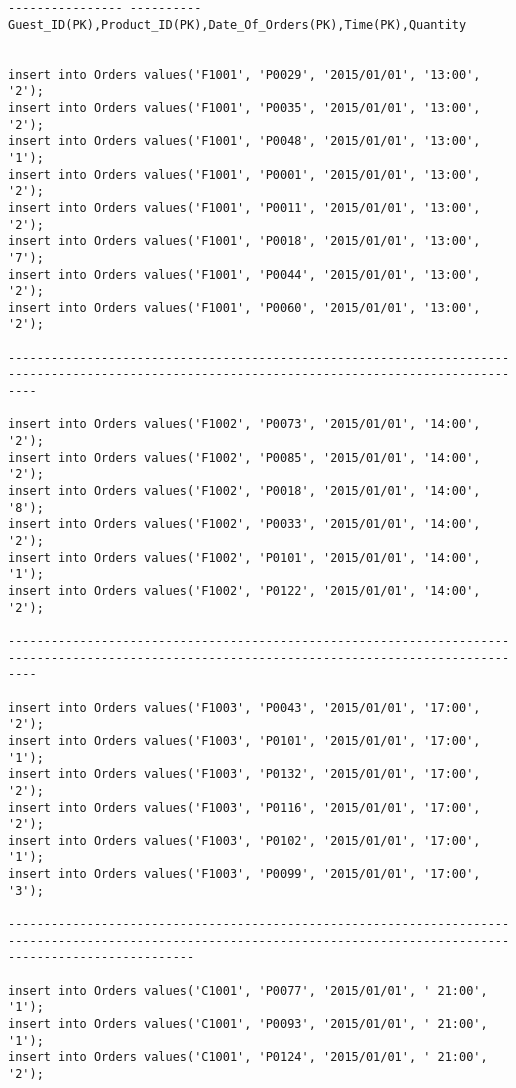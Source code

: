 \documentclass[a4,12pt]{report}
\begin{document}
\begin{lstlisting}
---------------- ----------Guest_ID(PK),Product_ID(PK),Date_Of_Orders(PK),Time(PK),Quantity


insert into Orders values('F1001', 'P0029', '2015/01/01', '13:00', '2');
insert into Orders values('F1001', 'P0035', '2015/01/01', '13:00', '2');
insert into Orders values('F1001', 'P0048', '2015/01/01', '13:00', '1');
insert into Orders values('F1001', 'P0001', '2015/01/01', '13:00', '2');
insert into Orders values('F1001', 'P0011', '2015/01/01', '13:00', '2');
insert into Orders values('F1001', 'P0018', '2015/01/01', '13:00', '7');
insert into Orders values('F1001', 'P0044', '2015/01/01', '13:00', '2');
insert into Orders values('F1001', 'P0060', '2015/01/01', '13:00', '2');

------------------------------------------------------------------------------------------------------------------------------------------------

insert into Orders values('F1002', 'P0073', '2015/01/01', '14:00', '2');
insert into Orders values('F1002', 'P0085', '2015/01/01', '14:00', '2');
insert into Orders values('F1002', 'P0018', '2015/01/01', '14:00', '8');
insert into Orders values('F1002', 'P0033', '2015/01/01', '14:00', '2');
insert into Orders values('F1002', 'P0101', '2015/01/01', '14:00', '1');
insert into Orders values('F1002', 'P0122', '2015/01/01', '14:00', '2');

------------------------------------------------------------------------------------------------------------------------------------------------

insert into Orders values('F1003', 'P0043', '2015/01/01', '17:00', '2');
insert into Orders values('F1003', 'P0101', '2015/01/01', '17:00', '1');
insert into Orders values('F1003', 'P0132', '2015/01/01', '17:00', '2');
insert into Orders values('F1003', 'P0116', '2015/01/01', '17:00', '2');
insert into Orders values('F1003', 'P0102', '2015/01/01', '17:00', '1');
insert into Orders values('F1003', 'P0099', '2015/01/01', '17:00', '3');

----------------------------------------------------------------------------------------------------------------------------------------------------------------------

insert into Orders values('C1001', 'P0077', '2015/01/01', ' 21:00', '1');
insert into Orders values('C1001', 'P0093', '2015/01/01', ' 21:00', '1');
insert into Orders values('C1001', 'P0124', '2015/01/01', ' 21:00', '2');


\end{lstlisting}
\end{document}
